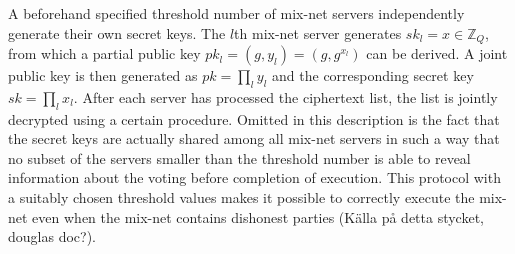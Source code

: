 A beforehand specified threshold number of mix-net servers
independently generate their own secret keys. The $l$th mix-net server
generates $sk_l = x \in \mathbb{Z}_Q$, from which a partial public key
$pk_l = (g,y_l) = (g,g^{x_l})$ can be derived. A joint public key is
then generated as $pk = \prod_l y_l$ and the corresponding secret key
$sk = \prod_l x_l$. After each server has processed the ciphertext
list, the list is jointly decrypted using a certain procedure. Omitted
in this description is the fact that the secret keys are actually
shared among all mix-net servers in such a way that no subset of the
servers smaller than the threshold number is able to reveal
information about the voting before completion of execution. This
protocol with a suitably chosen threshold values makes it possible to
correctly execute the mix-net even when the mix-net contains dishonest
parties (Källa på detta stycket, douglas doc?).


